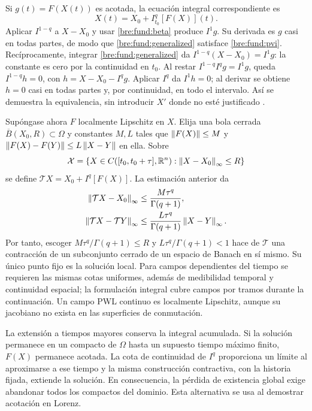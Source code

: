 Si $g(t)=F(X(t))$ es acotada, la ecuación integral correspondiente es
\begin{equation}
 X(t)=X_0+I_{t_0}^q[F(X)](t).
 \label{bre:fund:volterra}
\end{equation}
Aplicar $I^{1-q}$ a $X-X_0$ y usar \eqref{bre:fund:beta} produce
$I^1g$. Su derivada es $g$ casi en todas partes, de modo que
\eqref{bre:fund:generalized} satisface \eqref{bre:fund:pvi}.
Recíprocamente, integrar \eqref{bre:fund:generalized} da
$I^{1-q}(X-X_0)=I^1g$: la constante es cero por la continuidad en $t_0$.
Al restar $I^{1-q}I^qg=I^1g$, queda $I^{1-q}h=0$, con
$h=X-X_0-I^qg$. Aplicar $I^q$ da $I^1h=0$; al derivar se obtiene
$h=0$ casi en todas partes y, por continuidad, en todo el intervalo.
Así se demuestra la equivalencia, sin introducir $X'$ donde no esté
justificado \cite{Podlubny1999}.

Supóngase ahora $F$ localmente Lipschitz en $X$. Elija una bola cerrada
$\overline B(X_0,R)\subset\Omega$ y constantes $M,L$ tales que
$\left\lVert F(X)\right\rVert\le M$ y
$\left\lVert F(X)-F(Y)\right\rVert\le L\left\lVert X-Y\right\rVert$ en ella. Sobre
\[
 \mathcal X=\{X\in C([t_0,t_0+\tau],\mathbb R^n):
               \left\lVert X-X_0\right\rVert_\infty\le R\}
\]
se define $\mathcal TX=X_0+I^q[F(X)]$. La estimación anterior da
\begin{align}
 \left\lVert\mathcal TX-X_0\right\rVert_\infty&\le\frac{M\tau^q}{\Gamma(q+1)},\nonumber\\
 \left\lVert\mathcal TX-\mathcal TY\right\rVert_\infty
 &\le\frac{L\tau^q}{\Gamma(q+1)}\left\lVert X-Y\right\rVert_\infty.
 \label{bre:fund:contraction}
\end{align}
Por tanto, escoger $M\tau^q/\Gamma(q+1)\le R$ y
$L\tau^q/\Gamma(q+1)<1$ hace de $\mathcal T$ una contracción de un
subconjunto cerrado de un espacio de Banach en sí mismo. Su único punto
fijo es la solución local. Para campos dependientes del tiempo se requieren
las mismas cotas uniformes, además de medibilidad temporal y continuidad
espacial; la formulación integral cubre campos por tramos durante la
continuación. Un campo PWL continuo es localmente Lipschitz, aunque su
jacobiano no exista en las superficies de conmutación.

La extensión a tiempos mayores conserva la integral acumulada. Si la
solución permanece en un compacto de $\Omega$ hasta un supuesto tiempo
máximo finito, $F(X)$ permanece acotada. La cota de continuidad de $I^q$
proporciona un límite al aproximarse a ese tiempo y la misma construcción
contractiva, con la historia fijada, extiende la solución. En consecuencia,
la pérdida de existencia global exige abandonar todos los compactos del
dominio. Esta alternativa se usa al demostrar acotación en Lorenz.

